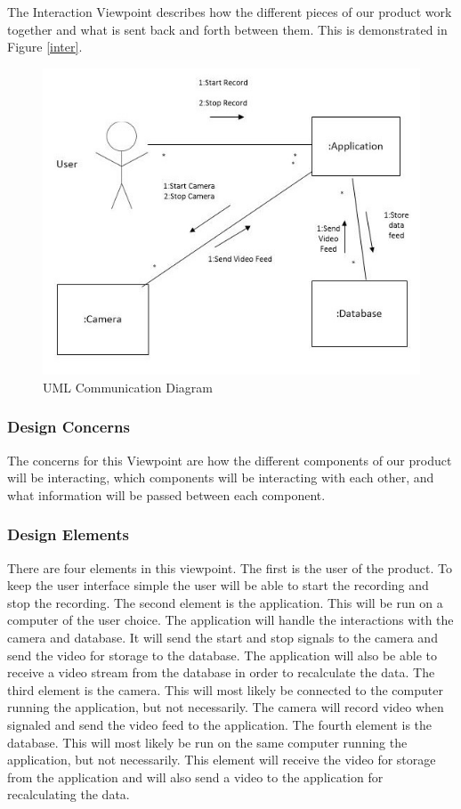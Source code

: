 \documentclass[letterpaper,10pt,onecolumn,draftclsnofoot]{IEEEtran}
\begin{document}
The Interaction Viewpoint describes how the different pieces of our product work together and what is sent back and forth between them. 
This is demonstrated in Figure \ref{inter}.
\label{inter}
\begin{figure}[H]
\includegraphics[scale=.6]{interaction_diagram}
\caption{UML Communication Diagram}
\end{figure}


\subsubsection{Design Concerns}

The concerns for this Viewpoint are how the different components of our product will be interacting, which components will be interacting with each other, and what information will be passed between each component.

\subsubsection{Design Elements}

There are four elements in this viewpoint.
The first is the user of the product.
To keep the user interface simple the user will be able to start the recording and stop the recording.
The second element is the application.
This will be run on a computer of the user choice.
The application will handle the interactions with the camera and database.
It will send the start and stop signals to the camera and send the video for storage to the database.
The application will also be able to receive a video stream from the database in order to recalculate the data.
The third element is the camera.
This will most likely be connected to the computer running the application, but not necessarily. The camera will record video when signaled and send the video feed to the application.
The fourth element is the database.
This will most likely be run on the same computer running the application, but not necessarily.
This element will receive the video for storage from the application and will also send a video to the application for recalculating the data.
\end{document}
